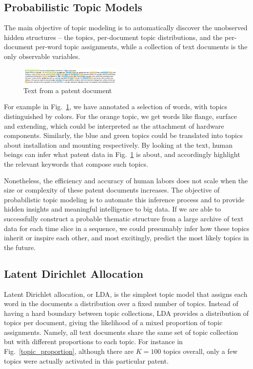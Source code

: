 \documentclass[conference]{IEEEtran}
\begin{document}
\subsection{Probabilistic Topic Models}

The main objective of topic modeling is to automatically discover the unobserved hidden structures -- the topics, per-document topic distributions, and the per-document per-word topic assignments, while a collection of text documents is the only observable variables. 

\begin{figure}[h]
    \center    
	\includegraphics[width=0.45\textwidth]{fig/pat007.png}
	\caption{Text from a patent document}
	\label{sample_patent}
\end{figure}

For example in Fig.~\ref{sample_patent}, we have annotated a selection of words, with topics distinguished by colors. For the orange topic, we get words like flange, surface and extending, which could be interpreted as the attachment of hardware components. Similarly, the blue and green topics could be translated into topics about installation and mounting respectively. By looking at the text, human beings can infer what patent data in Fig.~\ref{sample_patent} is about, and accordingly highlight the relevant keywords that compose such topics. 

Nonetheless, the efficiency and accuracy of human labors does not scale when the size or complexity of these patent documents increases. The objective of probabilistic topic modeling is to automate this inference process and to provide hidden insights and meaningful intelligence to big data. If we are able to successfully construct a probable thematic structure from a large archive of text data for each time slice in a sequence, we could presumably infer how these topics inherit or inspire each other, and most excitingly, predict the most likely topics in the future.




\subsection{Latent Dirichlet Allocation}
Latent Dirichlet allocation, or LDA, is the simplest topic model \cite{lda2003} that assigns each word in the documents a distribution over a fixed number of topics. Instead of having a hard boundary between topic collections, LDA provides a distribution of topics per document, giving the likelihood of a mixed proportion of topic assignments. Namely, all text documents share the same set of topic collection but with different proportions to each topic. For instance in Fig.~\ref{topic_proportion}, although there are $K=100$ topics overall, only a few topics were actually activated in this particular patent.
\end{document}
